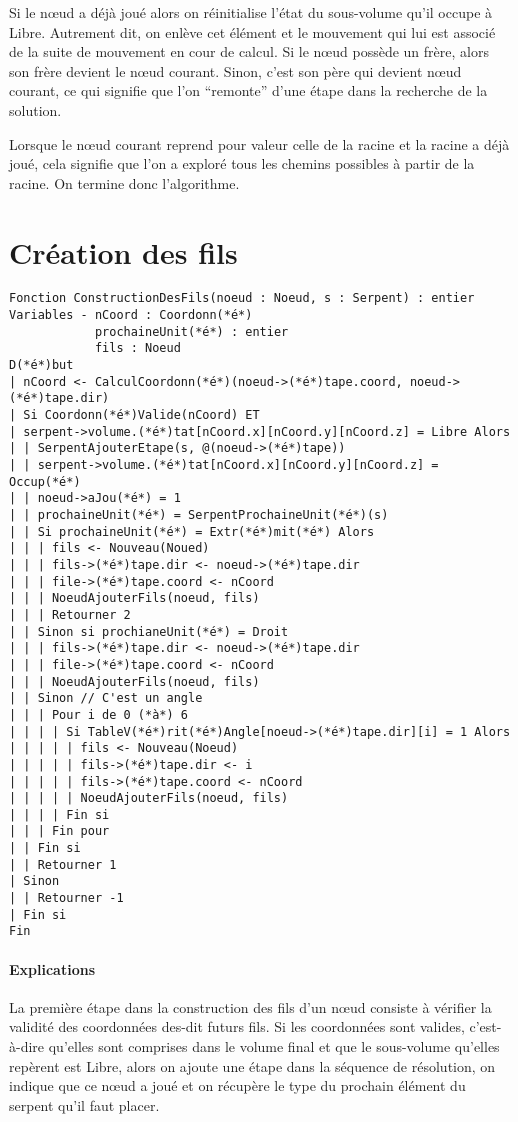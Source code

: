 Si le nœud a déjà joué alors on réinitialise l'état du sous-volume qu'il occupe à Libre. Autrement dit, on enlève cet élément et le mouvement qui lui est associé de la suite de mouvement en cour de calcul. Si le nœud possède un frère, alors son frère devient le nœud courant. Sinon, c'est son père qui devient nœud courant, ce qui signifie que l'on ``remonte'' d'une étape dans la recherche de la solution.

Lorsque le nœud courant reprend pour valeur celle de la racine et la racine a déjà joué, cela signifie que l'on a exploré tous les chemins possibles à partir de la racine. On termine donc l'algorithme.

\newpage
\section{Création des fils}

\begin{lstlisting}[caption=Algorithme de création des fils]
Fonction ConstructionDesFils(noeud : Noeud, s : Serpent) : entier
Variables - nCoord : Coordonn(*é*)
            prochaineUnit(*é*) : entier
            fils : Noeud
D(*é*)but
| nCoord <- CalculCoordonn(*é*)(noeud->(*é*)tape.coord, noeud->(*é*)tape.dir)
| Si Coordonn(*é*)Valide(nCoord) ET
| serpent->volume.(*é*)tat[nCoord.x][nCoord.y][nCoord.z] = Libre Alors
| | SerpentAjouterEtape(s, @(noeud->(*é*)tape))
| | serpent->volume.(*é*)tat[nCoord.x][nCoord.y][nCoord.z] = Occup(*é*)
| | noeud->aJou(*é*) = 1
| | prochaineUnit(*é*) = SerpentProchaineUnit(*é*)(s)
| | Si prochaineUnit(*é*) = Extr(*é*)mit(*é*) Alors
| | | fils <- Nouveau(Noued)
| | | fils->(*é*)tape.dir <- noeud->(*é*)tape.dir
| | | file->(*é*)tape.coord <- nCoord
| | | NoeudAjouterFils(noeud, fils)
| | | Retourner 2
| | Sinon si prochianeUnit(*é*) = Droit
| | | fils->(*é*)tape.dir <- noeud->(*é*)tape.dir
| | | file->(*é*)tape.coord <- nCoord
| | | NoeudAjouterFils(noeud, fils)
| | Sinon // C'est un angle
| | | Pour i de 0 (*à*) 6
| | | | Si TableV(*é*)rit(*é*)Angle[noeud->(*é*)tape.dir][i] = 1 Alors
| | | | | fils <- Nouveau(Noeud)
| | | | | fils->(*é*)tape.dir <- i
| | | | | fils->(*é*)tape.coord <- nCoord
| | | | | NoeudAjouterFils(noeud, fils)
| | | | Fin si
| | | Fin pour
| | Fin si
| | Retourner 1
| Sinon
| | Retourner -1
| Fin si
Fin
\end{lstlisting}

\paragraph{Explications} La première étape dans la construction des fils d'un nœud consiste à vérifier la validité des coordonnées des-dit futurs fils. Si les coordonnées sont valides, c'est-à-dire qu'elles sont comprises dans le volume final et que le sous-volume qu'elles repèrent est Libre, alors on ajoute une étape dans la séquence de résolution, on indique que ce nœud a joué et on récupère le type du prochain élément du serpent qu'il faut placer.

